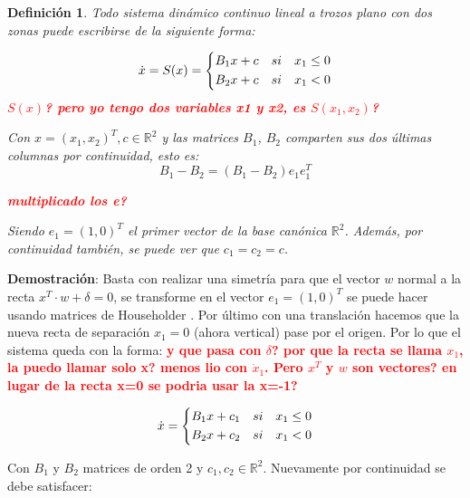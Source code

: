 \documentclass[12pt,a4paper]{report} %
\newtheorem{definicion}{Definición} %
\begin{document}
	\begin{definicion}
		Todo sistema dinámico continuo lineal a trozos plano con dos zonas puede escribirse de la siguiente forma:
	
	\begin{equation}
		\dot{x}=S(x)=
		\label{eq:lien}
		\scalebox{1}{$\displaystyle
			\left\{
			\begin{aligned}
				B_1x+c\quad si \quad x_1 \leq 0 \\
				B_2x+c\quad si \quad x_1 < 0
			\end{aligned}
			\right.
			$}
	\end{equation}\smallskip
	\textbf{\textcolor{red}{$S(x)$? pero yo tengo dos variables x1 y x2, es $S(x_1,x_2)$? }}
	
	Con $x=(x_1,x_2)^T, c\in \mathbb{R}^2$ y las matrices $B_1$, $B_2$ comparten sus dos últimas columnas por continuidad, esto es:
	\begin{equation}
		B_1-B_2 = \left(B_1-B_2\right)e_1e_1^T 
	\end{equation}\smallskip
	
	\textbf{\textcolor{red}{multiplicado los e?}}
	
	Siendo $e_1=(1,0)^T$ el primer vector de la base canónica $\mathbb{R}^2$. Además, por continuidad también, se puede ver que $c_1=c_2=c$.
    \end{definicion}\smallskip

	
	\textbf{Demostración}: Basta con realizar una simetría para que el vector $w$ normal a la recta $x^T\cdotp w+\delta=0$, se transforme en el vector $e_1=(1,0)^T$ se puede hacer usando matrices de Householder \cite{docvic}. Por último con una translación hacemos que la nueva recta de separación $x_1=0$ (ahora vertical) pase por el origen. Por lo que el sistema queda con la forma:
	\textbf{\textcolor{red}{y que pasa con $\delta$? por que la recta se llama $x_1$, la puedo llamar solo x? menos lio con $\dot{x}_1$. Pero $x^T$ y $w$ son vectores? en lugar de la recta x=0 se podria usar la x=-1?}}
	
	\begin{equation}
		\dot{x}=
		\label{eq:lien2}
		\scalebox{1}{$\displaystyle
			\left\{
			\begin{aligned}
			B_1x+c_1\quad si \quad x_1 \leq 0 \\
			B_2x+c_2\quad si \quad x_1 < 0
			\end{aligned}
			\right.
			$}
	\end{equation}\smallskip
	
	Con $B_1$ y $B_2$ matrices de orden 2 y $c_1, c_2 \in \mathbb{R}^2$. Nuevamente por continuidad se debe satisfacer:
	
\end{document}
